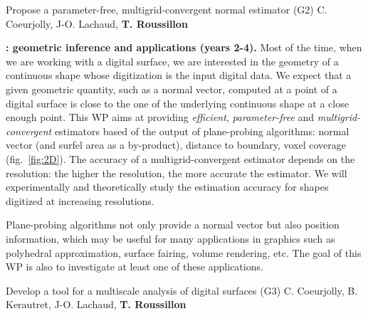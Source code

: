 
\newpage

   {Propose a parameter-free, multigrid-convergent normal estimator (G2)}
   {C. Coeurjolly, J-O. Lachaud, \textbf{T. Roussillon}}
\medskip

\noindent\textbf{\wpEstim: geometric inference and applications (years 2-4).} Most of the time, when we are working with a digital surface, we are 
interested in the geometry of a continuous shape whose digitization is the input digital data.
We expect that a given geometric quantity, such as a normal vector, computed at a point of a digital surface is close to the one of the underlying continuous shape at a close enough point. 
This WP aims at providing \emph{efficient}, \emph{parameter-free} and \emph{multigrid-convergent} estimators based of the output of plane-probing algorithms: normal vector (and surfel area as a by-product), distance to boundary, voxel coverage (fig.~\ref{fig:2D}). The accuracy of a multigrid-convergent estimator depends on the resolution: the higher the resolution, the more accurate the estimator. We will experimentally and theoretically study the estimation accuracy for shapes digitized at increasing resolutions. 

Plane-probing algorithms not only provide a normal vector but also position information, which may be useful for many applications in graphics such as polyhedral approximation, surface fairing, volume rendering, etc. The goal of this WP is also to investigate at least one of these applications.   

\newpage

   {Develop a tool for a multiscale analysis of digital surfaces (G3)}
   {C. Coeurjolly, B. Kerautret, J-O. Lachaud, \textbf{T. Roussillon}}
\medskip

